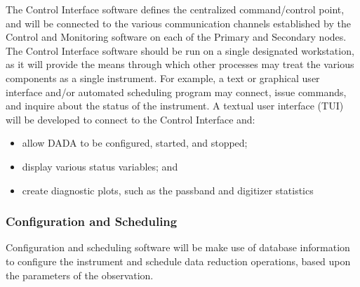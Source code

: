 The Control Interface software defines the centralized command/control
point, and will be connected to the various communication channels
established by the Control and Monitoring software on each of the
Primary and Secondary nodes.  The Control Interface software should be
run on a single designated workstation, as it will provide the means
through which other processes may treat the various components as a
single instrument.  For example, a text or graphical user interface
and/or automated scheduling program may connect, issue commands, and
inquire about the status of the instrument.  A textual user interface
(TUI) will be developed to connect to the Control Interface and:
\begin{itemize}
\item allow DADA to be configured, started, and stopped;

\item display various status variables; and

\item create diagnostic plots, such as the passband and digitizer statistics
\end{itemize}

\subsubsection{Configuration and Scheduling}

Configuration and scheduling software will be make use of database
information to configure the instrument and schedule data reduction
operations, based upon the parameters of the observation.
